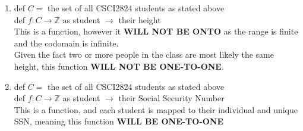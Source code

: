\documentclass[11pt]{amsart}
\newcommand{\be}{\begin{enumerate}}
\newcommand{\ee}{\end{enumerate}}
\begin{document}
\begin{sol}
	\be
		\item def $C=$ the set of all CSCI2824 students as stated above\\
		def $f: C \rightarrow \mathbb{Z}$ as student $\rightarrow$ their height\\
		This is a function, however it \textbf{WILL NOT BE ONTO} as the range is finite and the codomain is infinite.\\
		Given the fact two or more people in the class are most likely the same height, this function \textbf{WILL NOT BE ONE-TO-ONE}.
		\item def $C=$ the set of all CSCI2824 students as stated above\\
		def $f: C \rightarrow \mathbb{Z}$ as student $\rightarrow$ their Social Security Number\\
		This is a function, and each student is mapped to their individual and unique SSN, meaning this function \textbf{WILL BE ONE-TO-ONE}
	\ee
\end{sol}
\end{document}
